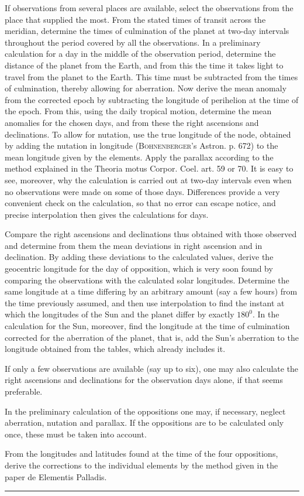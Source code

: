 If observations from several places are available, select the observations from the place that supplied the most. From the stated times of transit across the meridian, determine the times of culmination of the planet at two-day intervals throughout the period covered by all the observations. In a preliminary calculation for a day in the middle of the observation period, determine the distance of the planet from the Earth, and from this the time it takes light to travel from the planet to the Earth. This time must be subtracted from the times of culmination, thereby allowing for aberration. Now derive the mean anomaly from the corrected epoch by subtracting the longitude of perihelion at the time of the epoch. From this, using the daily tropical motion, determine the mean anomalies for the chosen days, and from these the right ascensions and declinations. To allow for nutation, use the true longitude of the node, obtained by adding the nutation in longitude (\textsc{Bohnenberger}'s Astron. p. 672) to the mean longitude given by the elements. Apply the parallax according to the method explained in the Theoria motus Corpor. Coel. art. 59 or 70. It is easy to see, moreover, why the calculation is carried out at two-day intervals even when no observations were made on some of those days. Differences provide a very convenient check on the calculation, so that no error can escape notice, and precise interpolation then gives the calculations for  days.

Compare the right ascensions and declinations thus obtained with those observed and determine from them the mean deviations in right ascension and in declination. By adding these deviations to the calculated values, derive the geocentric longitude for the day of opposition, which is very soon found by comparing the observations with the calculated solar longitudes. Determine the same longitude at a time differing by an arbitrary amount (say a few hours) from the time previously assumed, and then use interpolation to find the instant at which the longitudes of the Sun and the planet differ by exactly \(180^{0}\). In the calculation for the Sun, moreover, find the  longitude at the time of culmination corrected for the aberration of the planet, that is, add the Sun's aberration to the longitude obtained from the tables, which already includes it.

If only a few observations are available (say up to six), one may also calculate the right ascensions and declinations for the observation days alone, if that seems preferable.

In the preliminary calculation of the oppositions one may, if necessary, neglect aberration, nutation and parallax. If the oppositions are to be calculated only once, these must be taken into account.

From the longitudes and latitudes found at the time of the four oppositions, derive the corrections to the individual elements by the method given in the paper de Elementis Palladis.

\par\medskip\begin{center}\rule{.22\textwidth}{.3pt}\end{center}
